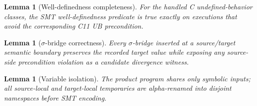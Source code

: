 \documentclass[10pt,a4paper]{article}
\newtheorem{lemma}[theorem]{Lemma}
\begin{document}
\begin{lemma}[Well-definedness completeness]\label{lem:wd-complete}
For the handled C undefined-behavior classes, the SMT well-definedness predicate
is true exactly on executions that avoid the corresponding C11 UB precondition.
\end{lemma}

\begin{lemma}[$\sigma$-bridge correctness]\label{lem:sigma-correct}
Every $\sigma$-bridge inserted at a source/target semantic boundary preserves the
recorded target value while exposing any source-side precondition violation as a
candidate divergence witness.
\end{lemma}

\begin{lemma}[Variable isolation]\label{lem:var-isolation}
The product program shares only symbolic inputs; all source-local and
target-local temporaries are alpha-renamed into disjoint namespaces before SMT
encoding.
\end{lemma}
\end{document}
